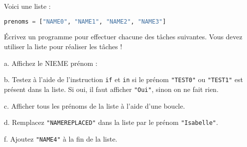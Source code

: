 \documentclass[12pt]{exam}
\begin{document}
\begin{questions}
\question[11] Voici une liste :
\begin{lstlisting}[language=Python]
prenoms = ["NAME0", "NAME1", "NAME2", "NAME3"]
\end{lstlisting}
Écrivez un programme pour effectuer chacune des tâches suivantes. Vous devez utiliser la liste pour réaliser les tâches !

a. Affichez le NIEME prénom :
\fillwithgrid{12mm}

b. Testez à l’aide de l’instruction \texttt{if} et \texttt{in} si le prénom \texttt{"TEST0"} ou \texttt{"TEST1"} est présent dans la liste. Si oui, il faut afficher \texttt{"Oui"}, sinon on ne fait rien.
\fillwithgrid{12mm}

c. Afficher tous les prénoms de la liste à l’aide d’une boucle.
\fillwithgrid{12mm}

d. Remplacez \texttt{"NAMEREPLACED"} dans la liste par le prénom \texttt{"Isabelle"}.
\fillwithgrid{12mm}

f. Ajoutez \texttt{"NAME4"} à la fin de la liste.
\fillwithgrid{12mm}

\end{questions}
\end{document}
